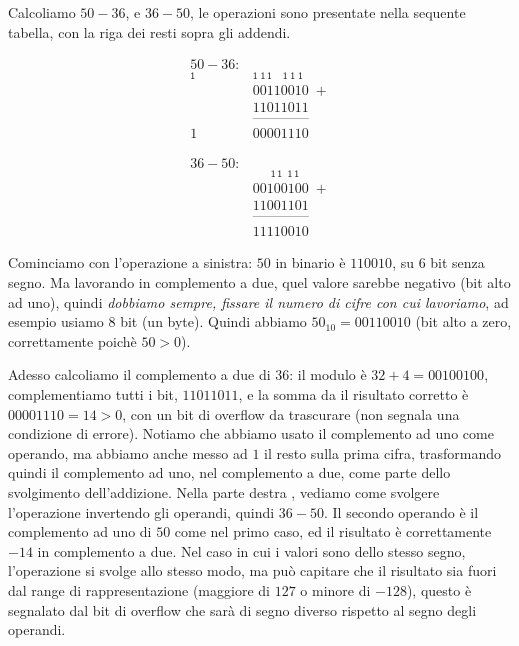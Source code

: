 \begin{ex}
Calcoliamo $50 - 36$, e $36 - 50$, le operazioni sono presentate nella sequente tabella, con la riga dei resti sopra gli addendi. 
\begin{center}\vspace{-1cm}
\begin{minipage}[t]{0.4\textwidth}
	\begin{align*}
50-36:\\
	\mathsf{_1}&\mathsf{_{1\; 1\, 1\; \;\;\; 1\; 1\; 1}}\\
		   &00110010\;+\\
		   &11011011\\[-1ex]
	       &\text{------------}\\[-1ex]
		  1&00001110
	\end{align*}
\end{minipage}
\hspace{1cm}
\begin{minipage}[t]{0.4\textwidth}
\begin{align*}
36-50:\\
       &\mathsf{_{\quad\;\;\; 1\, 1\;\; 1\, 1}}\\
	   &00100100\;+\\
	   &11001101\\[-1ex]
       &\text{------------}\\[-1ex]
	   &11110010
\end{align*}
\end{minipage}
\end{center}

Cominciamo con l'operazione a sinistra: $50$ in binario è $110010$, su $6$ bit
senza segno. Ma lavorando in complemento a due, quel valore sarebbe negativo
(bit alto ad uno), quindi \emph{dobbiamo sempre, fissare il numero di cifre con
cui lavoriamo}, ad esempio usiamo $8$ bit (un byte). Quindi abbiamo $50_{10} =
00110010$ (bit alto a zero, correttamente poichè $50 > 0$).

Adesso calcoliamo il complemento a due di $36$: il modulo è $32+4 = 00100100$,
complementiamo tutti i bit, $11011011$, e la somma da il risultato
corretto è $00001110 = 14 > 0$, con un bit di overflow da trascurare (non segnala una condizione di errore). Notiamo che abbiamo usato
il complemento ad uno come operando, ma abbiamo anche messo ad $1$ il resto sulla prima cifra, trasformando quindi il complemento ad uno, nel complemento
a due, come parte dello svolgimento dell'addizione.
Nella parte destra , vediamo come svolgere l'operazione invertendo
gli operandi, quindi $36-50$. Il secondo operando è il complemento ad uno di
$50$ come nel primo caso, ed il risultato è correttamente $-14$ in complemento a due.
Nel caso in cui i valori sono dello stesso segno, l'operazione si svolge allo stesso modo, ma può capitare che il risultato sia fuori dal range di rappresentazione (maggiore di $127$ o minore di $-128$), questo è segnalato
dal bit di overflow che sarà di segno diverso rispetto al segno degli operandi.
\end{ex}


